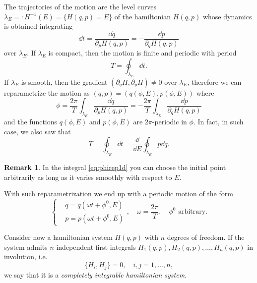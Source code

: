 \documentclass[english,fontsize=11pt,paper=b5]{scrbook}
\numberwithin{equation}{chapter}
\theoremstyle{definition}
\newtheorem{remark}{Remark}[chapter]
\begin{document}
      The trajectories of the motion are the level curves $\lambda_E =: H^{-1}(E) = \{H(q,p) = E\}$ of the hamiltonian $H(q,p)$ whose dynamics is obtained integrating
      \begin{equation}
        \dd t = \frac{\dd q}{\partial_p H(q,p)} = - \frac{\dd p}{\partial_q H(q,p)}
      \end{equation}
      over $\lambda_E$.
      If $\lambda_E$ is compact, then the motion is finite and periodic with period
      \begin{equation}
        T = \oint_{\lambda_E}\dd t.
      \end{equation}
      If $\lambda_E$ is smooth, then the gradient $(\partial_q H, \partial_p H)\neq 0$ over $\lambda_E$, therefore we can reparametrize the motion as $(q,p) = (q(\phi, E), p(\phi, E))$ where
      \begin{equation}\label{eq:phirep1d}
        \phi = \frac{2\pi}{T}\int_{\lambda_E} \frac{\dd q}{\partial_p H(q,p)} = -\frac{2\pi}{T}\int_{\lambda_E} \frac{\dd p}{\partial_q H(q,p)}
      \end{equation}
      and the functions $q(\phi, E)$ and $p(\phi, E)$ are $2\pi$-periodic in $\phi$.
      In fact, in such case, we also saw that
      \begin{equation}
        T = \oint_{\lambda_E}\dd t = \frac{\dd}{\dd E} \oint_{\lambda_E} p\dd q.
      \end{equation}

      \begin{remark}
        In the integral \eqref{eq:phirep1d} you can choose the initial point arbitrarily as long as it varies smoothly with respect to $E$.
      \end{remark}

      With such reparametrization we end up with a periodic motion of the form
      \begin{equation}
        \left\lbrace
          \begin{aligned}
     & q = q\left(\omega t + \phi^0, E\right) \\
     & p = p\left(\omega t + \phi^0, E\right)
          \end{aligned}
        \right., \quad \omega = \frac{2\pi}{T}, \quad \phi^0\mbox{ arbitrary}.
      \end{equation}

      \begin{tcolorbox}
        Consider now a hamiltonian system $H(q,p)$ with $n$ degrees of freedom.
        If the system admits $n$ independent first integrals $H_1(q,p), H_2(q,p), \ldots, H_n(q,p)$ in involution, i.e.
        \begin{equation}
          \big\{H_i, H_j\big\} = 0,\quad i,j=1,\ldots,n,
        \end{equation}
        we say that it is a \emph{completely integrable hamiltonian system}.
      \end{tcolorbox}
\end{document}
